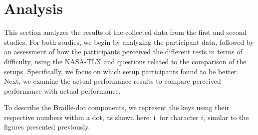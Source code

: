 \chapter{Analysis}
\label{ch:Analysis}

This section analyzes the results of the collected data from the first and second studies. For both studies, we begin by analyzing the participant data, followed by an assessment of how the participants perceived the different tests in terms of difficulty, using the NASA-TLX and questions related to the comparison of the setups. Specifically, we focus on which setup participants found to be better. Next, we examine the actual performance results to compare perceived performance with actual performance.

To describe the Braille-dot components, we represent the keys using their respective numbers within a dot, as shown here: \textcircled{i} for character $i$, similar to the figures presented previously.



